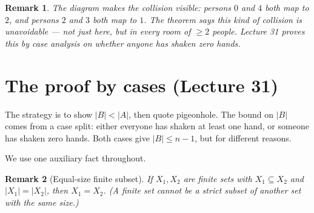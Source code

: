 \documentclass[11pt]{article}
\theoremstyle{defstyle}
\theoremstyle{thmstyle}
\theoremstyle{notstyle}
\newtheorem*{remark}{Remark}
\theoremstyle{cautionstyle}
\begin{document}
\begin{center}
\end{center}

\begin{notebox}
\begin{remark}
The diagram makes the collision visible: persons $0$ and $4$ both map to
$2$, and persons $2$ and $3$ both map to $1$. The theorem says this kind
of collision is unavoidable --- not just here, but in \emph{every} room
of $\geq 2$ people. Lecture 31 proves this by case analysis on whether
anyone has shaken zero hands.
\end{remark}
\end{notebox}

\section{The proof by cases (Lecture 31)}

The strategy is to show $|B| < |A|$, then quote pigeonhole. The bound on
$|B|$ comes from a case split: either everyone has shaken at least one
hand, or someone has shaken zero hands. Both cases give $|B| \leq n - 1$,
but for different reasons.

We use one auxiliary fact throughout.

\begin{notebox}
\begin{remark}[Equal-size finite subset]
If $X_1, X_2$ are finite sets with $X_1 \subseteq X_2$ and
$|X_1| = |X_2|$, then $X_1 = X_2$. (A finite set cannot be a strict
subset of another set with the same size.)
\end{remark}
\end{notebox}
\end{document}
